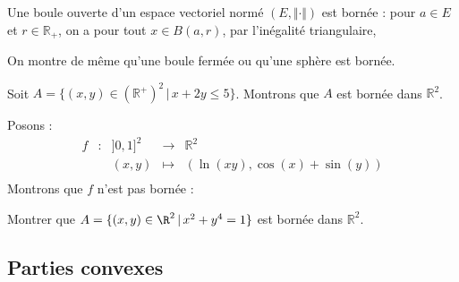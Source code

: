\documentclass[a4paper,10pt]{report}
\begin{document}
\begin{exems}
\item Une boule ouverte d'un espace vectoriel normé $(E, \Vert \cdot \Vert)$ est bornée : pour $a \in E$ et $r \in \mathbb{R}_+$, on a pour tout $x \in B(a,r)$, par l'inégalité triangulaire,

\vspace{2cm}
On montre de même qu'une boule fermée ou qu'une sphère est bornée.
\item Soit $A = \lbrace (x,y) \in (\mathbb{R}^+)^2 \, \vert \, x+2y \leq 5 \rbrace$. Montrons que $A$ est bornée dans $\mathbb{R}^2$.

\vspace{4cm}
\item Posons :
$$ \begin{array}{ccccl}
f & : & ]0,1]^2 & \rightarrow & \mathbb{R}^2 \\
& & (x,y)   & \mapsto & (\ln(xy), \cos(x)+ \sin(y)) \\
\end{array}$$
Montrons que $f$ n'est pas bornée : 

\vspace{4cm}
\end{exems}

\begin{exa} Montrer que $A = \lbrace (x,y)\in\R^2 \, \vert \, x^2+y^4=1 \rbrace$ est bornée dans $\mathbb{R}^2$.
\end{exa}

\subsection{Parties convexes}
\end{document}
